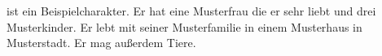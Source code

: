 
{%
  ist ein Beispielcharakter. Er hat eine Musterfrau die er sehr liebt und drei Musterkinder.
  Er lebt mit seiner Musterfamilie in einem Musterhaus in Musterstadt. Er mag außerdem Tiere.
}
